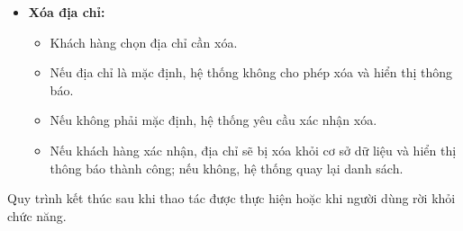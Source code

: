 \begin{itemize}
\begin{itemize}
        \item Hệ thống bỏ trạng thái mặc định của địa chỉ cũ và thiết lập địa chỉ mới làm mặc định.
        
        \item Thông tin được cập nhật vào cơ sở dữ liệu và hiển thị thông báo thành công.
    \end{itemize}
    
    \item \textbf{Xóa địa chỉ:}
    \begin{itemize}
        \item Khách hàng chọn địa chỉ cần xóa.
        
        \item Nếu địa chỉ là mặc định, hệ thống không cho phép xóa và hiển thị thông báo.
        
        \item Nếu không phải mặc định, hệ thống yêu cầu xác nhận xóa.
        
        \item Nếu khách hàng xác nhận, địa chỉ sẽ bị xóa khỏi cơ sở dữ liệu và hiển thị thông báo thành công; nếu không, hệ thống quay lại danh sách.
    \end{itemize}
\end{itemize}

Quy trình kết thúc sau khi thao tác được thực hiện hoặc khi người dùng rời khỏi chức năng.


